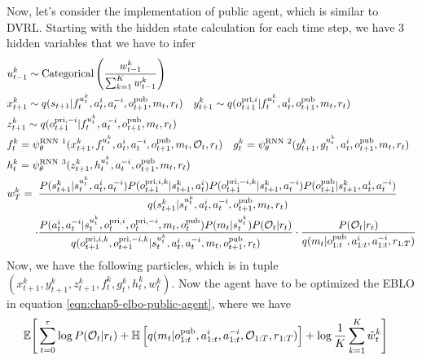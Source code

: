 \label{sec:chap5-public-agent-implementation}
Now, let's consider the implementation of public agent, which is similar to DVRL. Starting with the hidden state calculation for each time step, we have 3 hidden variables that we have to infer
\begin{equation}
\begin{aligned}
    &u^k_{t-1} \sim \text{Categorical}\left( \frac{w^k_{t-1}}{\sum^K_{k=1}w^k_{t-1}} \right) \\
    &x^k_{t+1} \sim q(s_{t+1} | f^{u^k_t}_t, a^i_t, a^{-i}_t, o^{\operatorname{pub}}_{t+1}, m_t, r_t) \quad y^k_{t+1} \sim q(o^{\operatorname{pri}, i}_{t+1} | f^{u^k_t}_t, a^i_t, o^{\operatorname{pub}}_{t+1}, m_t, r_t) \\ 
    &z^k_{t+1} \sim q(o^{\operatorname{pri}, -i}_{t+1} | f^{u^k_t}_t, a^{-i}_t, o^{\operatorname{pub}}_{t+1}, m_t, r_t) \\
    &f^k_t = \psi^{\text{RNN} \ 1}_\theta (x^k_{t+1}, f^{u^k_t}_t, a^i_t, a^{-i}_t, o^{\operatorname{pub}}_{t+1}, m_t, \mathcal{O}_t, r_t) \quad g^k_t = \psi^{\text{RNN} \ 2}_\theta (y^k_{t+1}, g^{u^k_t}_t, a^i_t, o^{\operatorname{pub}}_{t+1}, m_t, r_t) \\
    &h^k_t = \psi^{\text{RNN} \ 3}_\theta (z^k_{t+1}, h^{u^k_t}_t, a^{-i}_t, o^{\operatorname{pub}}_{t+1}, m_t, r_t) \\
    &w^k_T = \begin{aligned}[t]
        &\frac{P(s_{t+1}^k | s_t^{u^k_t}, a_t^i, a_t^{-i})P(o^{\operatorname{pri}, i, k}_{t+1} | s_{t+1}^k, a^i_t) P(o^{\operatorname{pri}, -i, k}_{t+1} | s_{t+1}^k, a^{-i}_t) P(o^{\operatorname{pub}}_{t+1} | s_{t+1}^k, a^i_t, a^{-i}_t)}{q(s_{t+1}^k | s_t^{u^k_t}, a^i_t, a^{-i}_t, o^{\operatorname{pub}}_{t+1}, m_t, r_t)} \\
        \cdot&\frac{P(a^i_t, a^{-i}_t | s_t^{u^k_t}, o^{\operatorname{pri}, i}_t, o^{\operatorname{pri}, -i}_t, m_t, o^{\operatorname{pub}}_t) P(m_t | s_t^{u^k_t}) P(\mathcal{O}_t | r_t)}{q(o^{\operatorname{pri}, i, k}_{t+1}, o^{\operatorname{pri}, -i, k}_{t+1} | s_t^{u^k_t}, a^i_t, a^{-i}_t, m_t, o^{\operatorname{pub}}_{t+1}, r_t)} \cdot \frac{P(\mathcal{O}_t | r_t)}{q(m_t | o^{\operatorname{pub}}_{1:t}, a^{i}_{1:t}, a^{-i}_{1:t}, r_{1:T})}
    \end{aligned}
\end{aligned}
\end{equation}
Now, we have the following particles, which is in tuple $(x^k_{t+1}, y^k_{t+1}, z^k_{t+1}, f^k_t, g^k_t, h^k_t, w^k_t)$. Now the agent have to be optimized the EBLO in equation \ref{eqn:chap5-elbo-public-agent}, where we have 
\begin{equation}
\begin{aligned}
\label{eqn:chap5-elbo-public-agent}
    \mathbb{E}\Bigg[\sum^\tau_{t=0} &\log P(\mathcal{O}_t | r_t) + \mathbb{H}\left[ q(m_t | o^{\operatorname{pub}}_{1:t}, a^{i}_{1:t}, a^{-i}_{1:t}, \mathcal{O}_{1:T}, r_{1:T}) \right] + \log \frac{1}{K} \sum ^K_{k=1}\tilde{w}_t^k\Bigg]
\end{aligned}
\end{equation}
